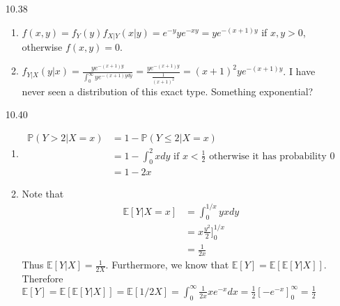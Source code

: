 \documentclass[12pt, letterpaper]{article}
\newcommand{\E}{\mathbb{E}}
\newcommand{\Pro}{\mathbb{P}}
\begin{document}
\begin{enumerate}
\begin{enumerate}
	\end{enumerate}
	\item[10.38]
	\begin{enumerate}
		\item $f(x,y) = f_Y(y) f_{X|Y}(x|y) = e^{-y}ye^{-xy} = ye^{-(x+1)y}$ if 
		$x,y > 0$, otherwise $f(x,y)  =0$.
		\item $f_{Y|X}(y|x) = 
		\frac{ye^{-(x+1)y}}{\int_0^\infty ye^{-(x+1)y dy}} = 
		\frac{ye^{-(x+1)y}}{\frac{1}{(x+1)^2}} =
		(x+1)^2 ye^{-(x+1)y}$.  I have never seen a distribution of this 
		exact type.  Something exponential?
	\end{enumerate}
	\item[10.40]
	\begin{enumerate}
		\item  \begin{align*}
			\Pro(Y > 2| X = x) &= 1 - \Pro(Y \leq 2 | X = x)\\
			&= 1 - \int_0^2 x dy \text{ if } x < \frac{1}{2} \text{ otherwise it has probability } 0\\
			&= 1 - 2x
		\end{align*}
		\item Note that \begin{align*}
			\E[Y|X=x] &= \int_0^{1/x} yxdy\\
			&= x \frac{y^2}{2}]^{1/x}_0\\
			&= \frac{1}{2x}
		\end{align*}
		Thus $\E[Y|X] =\frac{1}{2X}$.  Furthermore, we know that $\E[Y] = \E[\E[Y|X]]$.  Therefore $\E[Y] = \E[\E[Y|X]] = \E[1/2X] = \int_0^\infty \frac{1}{2x}xe^{-x}dx
		= \frac{1}{2}[-e^{-x}]_0^\infty = \frac{1}{2}$
	\end{enumerate}
\end{enumerate}
\end{document}
